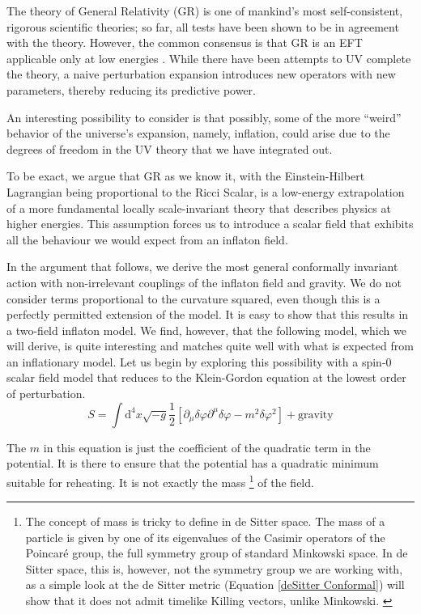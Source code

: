 \documentclass[aps,prd,reprint,preprintnumbers,showpacs,floatfix,nofootinbib,superscript address]{revtex4-2}
\begin{document}
The theory of General Relativity (GR) is one of mankind's most self-consistent, rigorous scientific theories; so far, all tests have been shown to be in agreement with the theory. However, the common consensus is that GR is an EFT applicable only at low energies \cite{donoghue_general_1994, burgess_quantum_2004}. While there have been attempts to UV complete the theory, a naive perturbation expansion introduces new operators with new parameters, thereby reducing its predictive power.

An interesting possibility to consider is that possibly, some of the more ``weird'' behavior of the universe's expansion, namely, inflation, could arise due to the degrees of freedom in the UV theory that we have integrated out. 

To be exact, we argue that GR as we know it, with the Einstein-Hilbert Lagrangian being proportional to the Ricci Scalar, is a low-energy extrapolation of a more fundamental locally scale-invariant theory that describes physics at higher energies. This assumption forces us to introduce a scalar field that exhibits all the behaviour we would expect from an inflaton field. 

In the argument that follows, we derive the most general conformally invariant action with non-irrelevant couplings of the inflaton field and gravity. We do not consider terms proportional to the curvature squared, even though this is a perfectly permitted extension of the model. It is easy to show that this results in a two-field inflaton model. We find, however, that the following model, which we will derive, is quite interesting and matches quite well with what is expected from an inflationary model. Let us begin by exploring this possibility with a spin-0 scalar field model that reduces to the Klein-Gordon equation at the lowest order of perturbation.
\begin{equation} \label{25}
    S = \int \mathrm{d}^4 x \sqrt{-g} \frac{1}{2} \left[ \partial_\mu \delta \varphi \partial^\mu \delta \varphi - m^2   \delta\varphi^2   \right] + \text{gravity}
\end{equation}

The $m$ in this equation is just the coefficient of the quadratic term in the potential. It is there to ensure that the potential has a quadratic minimum suitable for reheating. It is not exactly the mass \footnote{The concept of mass is tricky to define in de Sitter space. The mass of a particle is given by one of its eigenvalues of the Casimir operators of the Poincaré group, the full symmetry group of standard Minkowski space. In de Sitter space, this is, however, not the symmetry group we are working with, as a simple look at the de Sitter metric (Equation \ref{deSitter Conformal}) will show that it does not admit timelike Killing vectors, unlike Minkowski. \label{Footnote 1}} of the field.
\end{document}
